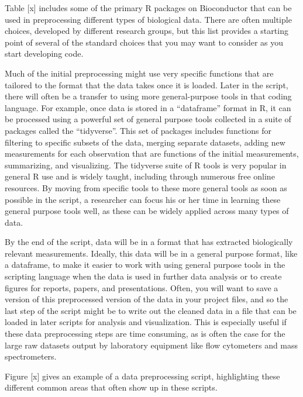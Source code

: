 \documentclass[]{tufte-book}
\begin{document}
Table {[}x{]} includes some of the primary R packages on Bioconductor that can be
used in preprocessing different types of biological data. There are often
multiple choices, developed by different research groups, but this list provides
a starting point of several of the standard choices that you may want to
consider as you start developing code.

Much of the initial preprocessing might use very specific functions that are
tailored to the format that the data takes once it is loaded. Later in the
script, there will often be a transfer to using more general-purpose tools in
that coding language. For example, once data is stored in a ``dataframe'' format
in R, it can be processed using a powerful set of general purpose tools
collected in a suite of packages called the ``tidyverse''. This set of packages
includes functions for filtering to specific subsets of the data, merging
separate datasets, adding new measurements for each observation that are
functions of the initial measurements, summarizing, and visualizing. The
tidyverse suite of R tools is very popular in general R use and is widely
taught, including through numerous free online resources. By moving from
specific tools to these more general tools as soon as possible in the script, a
researcher can focus his or her time in learning these general purpose tools
well, as these can be widely applied across many types of data.

By the end of the script, data will be in a format that has extracted
biologically relevant measurements. Ideally, this data will be in a general
purpose format, like a dataframe, to make it easier to work with using general
purpose tools in the scripting language when the data is used in further data
analysis or to create figures for reports, papers, and presentations. Often, you
will want to save a version of this preprocessed version of the data in your
project files, and so the last step of the script might be to write out the
cleaned data in a file that can be loaded in later scripts for analysis and
visualization. This is especially useful if these data preprocessing steps are
time consuming, as is often the case for the large raw datasets output by
laboratory equipment like flow cytometers and mass spectrometers.

Figure {[}x{]} gives an example of a data preprocessing script, highlighting these
different common areas that often show up in these scripts.
\end{document}
